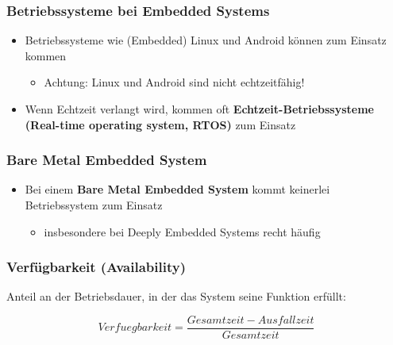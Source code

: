 \subsubsection{Betriebssysteme bei Embedded Systems}
\begin{itemize}
  \item Betriebssysteme wie (Embedded) Linux und Android können zum Einsatz kommen
  \begin{itemize}
    \item Achtung: Linux und Android sind nicht echtzeitfähig!
  \end{itemize}
  \item Wenn Echtzeit verlangt wird, kommen oft \textbf{Echtzeit-Betriebssysteme (Real-time operating system, RTOS)} zum Einsatz
\end{itemize}

\subsubsection{Bare Metal Embedded System}
\begin{itemize}
  \item Bei einem \textbf{Bare Metal Embedded System} kommt keinerlei Betriebssystem zum Einsatz
  \begin{itemize}
    \item insbesondere bei Deeply Embedded Systems recht häufig
  \end{itemize}
\end{itemize}

\subsubsection{Verfügbarkeit (Availability)}
Anteil an der Betriebsdauer, in  der das System seine Funktion
erfüllt:

\begin{equation}
Verfuegbarkeit = \frac{Gesamtzeit-Ausfallzeit}{Gesamtzeit}
\end{equation}

